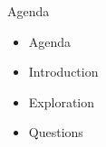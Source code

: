 \begin{frame}{Agenda}
	\begin{itemize}
		\item Agenda
		\item Introduction
		\item Exploration
		\item Questions
	\end{itemize}
\end{frame}
